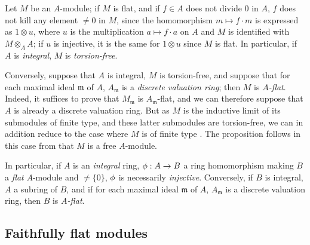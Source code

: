 \begin{env}[6.3.4]
\label{0.6.3.4}
Let $M$ be an $A$-module; if $M$ is flat, and if $f\in A$ does not divide $0$ in $A$, $f$
does not kill any element $\neq 0$ in $M$, since the homomorphism $m\mapsto f\cdot m$ is
expressed as $1\otimes u$, where $u$ is the multiplication $a\mapsto f\cdot a$ on $A$ and
$M$ is identified with $M\otimes_A A$; if $u$ is injective, it is the same for $1\otimes u$
since $M$ is flat. In particular, if $A$ is \emph{integral}, $M$ is \emph{torsion-free}.

Conversely, suppose that $A$ is integral, $M$ is torsion-free, and suppose that for each
maximal ideal $\mathfrak{m}$ of $A$, $A_\mathfrak{m}$ is a \emph{discrete valuation ring};
then $M$ is \emph{$A$-flat}. Indeed, it suffices  to prove that
$M_\mathfrak{m}$ is $A_\mathfrak{m}$-flat, and we can therefore suppose that $A$ is already
a discrete valuation ring. But as $M$ is the inductive limit of its submodules of finite
type, and these latter submodules are torsion-free, we can in addition reduce to the case
where $M$ is of finite type . The proposition follows in this
case from that $M$ is a free $A$-module.

In particular, if $A$ is an \emph{integral} ring, $\vphi:A\to B$ a ring homomorphism making
$B$ a \emph{flat} $A$-module and $\neq\{0\}$, $\phi$ is necessarily \emph{injective}.
Conversely, if $B$ is integral, $A$ a subring of $B$, and if for each maximal ideal
$\mathfrak{m}$ of $A$, $A_\mathfrak{m}$ is a discrete valuation ring, then $B$ is
\emph{$A$-flat}.
\end{env}

\subsection{Faithfully flat modules}
\label{subsection:0.6.4}

